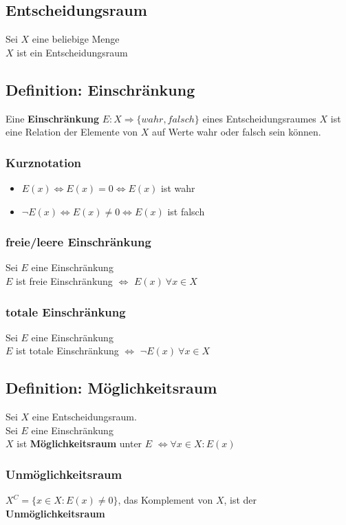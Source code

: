 \documentclass[12pt]{article}
\begin{document}
		\subsection{Entscheidungsraum}
			Sei $X$ eine beliebige Menge\\
			$X$ ist ein Entscheidungsraum
		\subsection{Definition: Einschränkung}
			Eine \textbf{Einschränkung} $E:X\Rightarrow \{wahr, falsch\}$ eines
			Entscheidungsraumes $X$ ist eine
			Relation der Elemente von $X$ auf Werte wahr oder falsch
			sein können.\\
			\subsubsection{Kurznotation}
				\begin{itemize}
					\item $E(x) \Leftrightarrow E(x)=0 \Leftrightarrow E(x)$ ist wahr
					\item $\neg E(x) \Leftrightarrow E(x)\neq 0 \Leftrightarrow E(x)$ ist falsch
				\end{itemize}
			\subsubsection{freie/leere Einschränkung}
				Sei $E$ eine Einschränkung\\
				$E$ ist freie Einschränkung $\Leftrightarrow$ $E(x)\> \forall x\in X$
			\subsubsection{totale Einschränkung}
				Sei $E$ eine Einschränkung\\
				$E$ ist totale Einschränkung $\Leftrightarrow$ $\neg E(x)\> \forall x\in X$
		\subsection{Definition: Möglichkeitsraum}
			Sei $X$ eine Entscheidungsraum.\\
			Sei $E$ eine Einschränkung\\
			$X$ ist \textbf{Möglichkeitsraum} unter $E$ $\Leftrightarrow \forall x\in X: E(x)$
			\subsubsection{Unmöglichkeitsraum}
				$X^C = \{x \in X: E(x)\neq 0\}$, das Komplement von $X$, ist der
				\textbf{Unmöglichkeitsraum}
\end{document}
